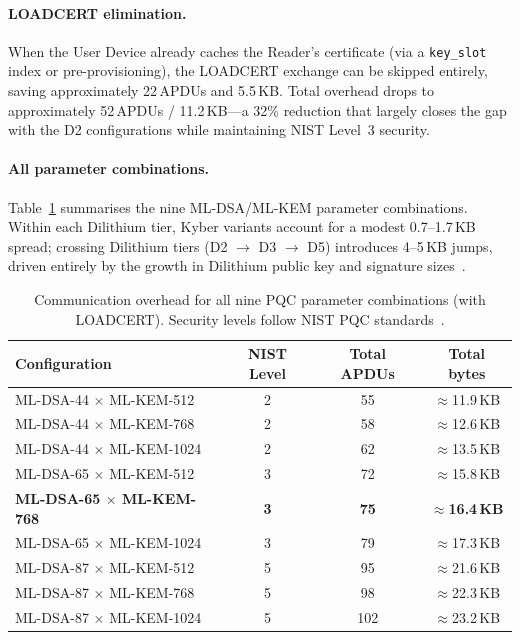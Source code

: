 \paragraph{LOADCERT elimination.}
When the User Device already caches the Reader's certificate (via a
\texttt{key\_slot} index or pre-provisioning), the LOADCERT exchange can be
skipped entirely, saving approximately 22\,APDUs and 5.5\,KB.  Total
overhead drops to approximately 52\,APDUs / 11.2\,KB—a 32\% reduction
that largely closes the gap with the D2 configurations while maintaining
NIST Level~3 security.

\paragraph{All parameter combinations.}
Table~\ref{tab:overhead_configs} summarises the nine ML-DSA/ML-KEM parameter
combinations.  Within each Dilithium tier, Kyber variants account for a
modest 0.7–1.7\,KB spread; crossing Dilithium tiers (D2 $\to$ D3 $\to$ D5)
introduces 4–5\,KB jumps, driven entirely by the growth in Dilithium public
key and signature sizes~\cite{NIST:FIPS204}.

\begin{table}[t]
\centering
\caption{Communication overhead for all nine PQC parameter combinations
(with LOADCERT).  Security levels follow NIST PQC standards~\cite{NIST:FIPS203,NIST:FIPS204}.}
\label{tab:overhead_configs}
\begin{tabular}{lccc}
\hline
\textbf{Configuration} & \textbf{NIST Level} & \textbf{Total APDUs} & \textbf{Total bytes} \\
\hline
ML-DSA-44 $\times$ ML-KEM-512  & 2 &  55 & $\approx$11.9\,KB \\
ML-DSA-44 $\times$ ML-KEM-768  & 2 &  58 & $\approx$12.6\,KB \\
ML-DSA-44 $\times$ ML-KEM-1024 & 2 &  62 & $\approx$13.5\,KB \\
ML-DSA-65 $\times$ ML-KEM-512  & 3 &  72 & $\approx$15.8\,KB \\
\textbf{ML-DSA-65 $\times$ ML-KEM-768} & \textbf{3} & \textbf{75} & $\mathbf{\approx}$\textbf{16.4\,KB} \\
ML-DSA-65 $\times$ ML-KEM-1024 & 3 &  79 & $\approx$17.3\,KB \\
ML-DSA-87 $\times$ ML-KEM-512  & 5 &  95 & $\approx$21.6\,KB \\
ML-DSA-87 $\times$ ML-KEM-768  & 5 &  98 & $\approx$22.3\,KB \\
ML-DSA-87 $\times$ ML-KEM-1024 & 5 & 102 & $\approx$23.2\,KB \\
\hline
\end{tabular}
\end{table}

